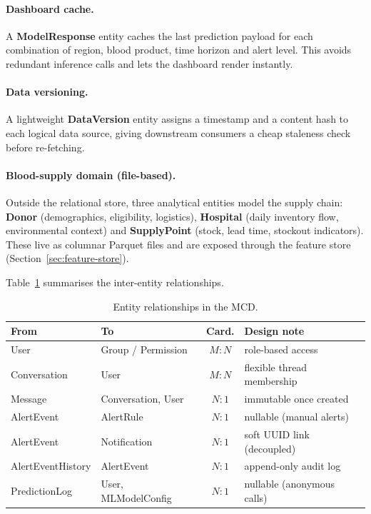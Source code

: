 \paragraph{Dashboard cache.}

A \textbf{ModelResponse} entity caches the last prediction payload for
each combination of region, blood product, time horizon and alert level.
This avoids redundant inference calls and lets the dashboard render
instantly.

\paragraph{Data versioning.}

A lightweight \textbf{DataVersion} entity assigns a timestamp and a
content hash to each logical data source, giving downstream consumers a
cheap staleness check before re-fetching.

\paragraph{Blood-supply domain (file-based).}

Outside the relational store, three analytical entities model the supply
chain: \textbf{Donor} (demographics, eligibility, logistics),
\textbf{Hospital} (daily inventory flow, environmental context) and
\textbf{SupplyPoint} (stock, lead time, stockout indicators).  These live
as columnar Parquet files and are exposed through the feature store
(Section~\ref{sec:feature-store}).

\bigskip

Table~\ref{tab:mcd-relationships} summarises the inter-entity
relationships.

\begin{table}[htbp]
\centering
\caption{Entity relationships in the MCD.}
\label{tab:mcd-relationships}
\small
\begin{tabular}{@{}llcl@{}}
\toprule
\textbf{From} & \textbf{To} & \textbf{Card.} & \textbf{Design note} \\
\midrule
User            & Group / Permission   & $M{:}N$ & role-based access \\
Conversation    & User                 & $M{:}N$ & flexible thread membership \\
Message         & Conversation, User   & $N{:}1$ & immutable once created \\
AlertEvent      & AlertRule            & $N{:}1$ & nullable (manual alerts) \\
AlertEvent      & Notification         & $N{:}1$ & soft UUID link (decoupled) \\
AlertEventHistory & AlertEvent         & $N{:}1$ & append-only audit log \\
PredictionLog   & User, MLModelConfig  & $N{:}1$ & nullable (anonymous calls) \\
\bottomrule
\end{tabular}
\end{table}


